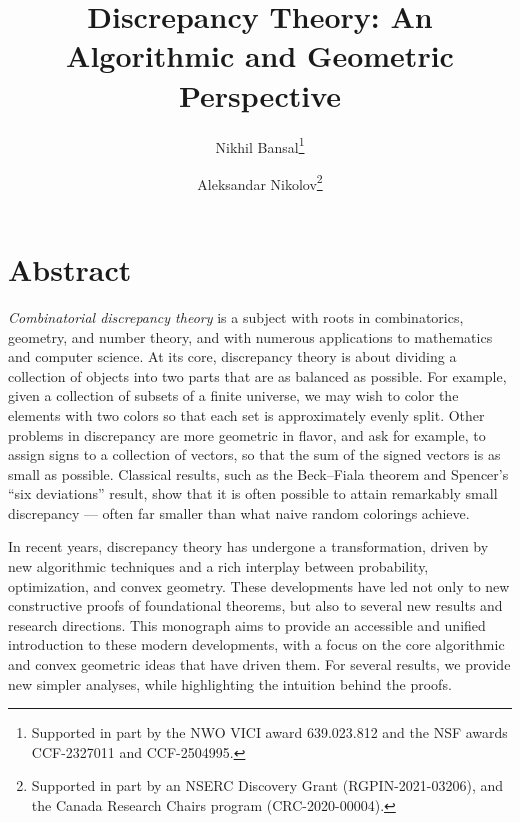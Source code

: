 \documentclass[11pt,oneside]{book}  %
\title{Discrepancy Theory: An Algorithmic and Geometric Perspective}
\author{
Nikhil Bansal\footnote{Supported in part by the NWO VICI award 639.023.812 and the NSF awards CCF-2327011 and CCF-2504995.} \and
Aleksandar Nikolov\footnote{Supported in part by an NSERC Discovery Grant (RGPIN-2021-03206), and the Canada Research Chairs program (CRC-2020-00004).}
}
\theoremstyle{plain}
\theoremstyle{definition}
\theoremstyle{remark}
\begin{document}

\frontmatter  %
\date{}
\maketitle



\chapter*{Abstract}
\emph{Combinatorial discrepancy theory} is a subject with roots in combinatorics, geometry, and number theory, and with numerous applications to mathematics and computer science. 
At its core, discrepancy theory is  about dividing a collection of objects into two parts that are as balanced as possible.
For example, given a collection of subsets of a finite universe, we may wish to color the elements with two colors so that each set is approximately evenly split.
Other problems in discrepancy are more geometric in flavor, and ask for example, to assign signs to a collection of vectors, so that the sum of the signed vectors is as small as possible.
Classical results, such as the Beck–Fiala theorem and Spencer’s “six deviations” result, show that it is often possible to attain remarkably small discrepancy --- often far smaller than what naive random colorings achieve.

In recent years, discrepancy theory has undergone a transformation, driven by new algorithmic techniques and a rich interplay between probability, optimization, and convex geometry.
These developments have led not only to new constructive proofs of foundational theorems, but also to several new results and research directions.
This monograph aims to provide an accessible and unified introduction to these modern developments, with a focus on the core algorithmic and convex geometric ideas that have driven them. For several results, we provide
new simpler analyses, while highlighting the intuition behind the proofs.
\end{document}
